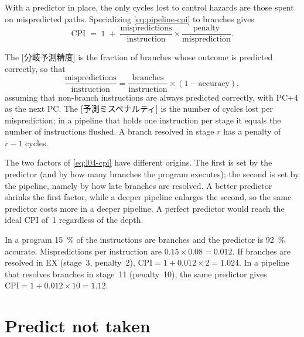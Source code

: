 \documentclass[../main.tex]{subfiles}
\begin{document}
With a predictor in place, the only cycles lost to control hazards are those
spent on mispredicted paths.
Specializing \cref{eq:pipeline-cpi} to branches gives
\begin{equation}
  \text{CPI} \;=\; 1 \;+\;
  \frac{\text{mispredictions}}{\text{instruction}} \times
  \frac{\text{penalty}}{\text{misprediction}} .
  \label{eq:l04-cpi}
\end{equation}

\begin{definition}
  The [分岐予測精度] is the fraction of
  branches whose outcome is predicted correctly, so that
  \begin{equation*}
    \frac{\text{mispredictions}}{\text{instruction}} =
    \frac{\text{branches}}{\text{instruction}} \times
    (1 - \text{accuracy}) ,
  \end{equation*}
  assuming that non-branch instructions are always predicted correctly, with
  PC+4 as the next PC.  The [予測ミスペナルティ] is
  the number of cycles lost per misprediction; in a pipeline that holds one
  instruction per stage it equals the number of instructions flushed.  A
  branch resolved in stage $r$ has a penalty of $r-1$ cycles.
\end{definition}

The two factors of \cref{eq:l04-cpi} have different origins.  The first is
set by the predictor (and by how many branches the program executes); the
second is set by the pipeline, namely by how late branches are resolved.  A
better predictor shrinks the first factor, while a deeper pipeline enlarges
the second, so the same predictor costs more in a deeper pipeline.  A perfect
predictor would reach the ideal CPI of~1 regardless of the depth.

\begin{example}
  \label{ex:l04-cpi}
  In a program \SI{15}{\percent} of the instructions are branches and the
  predictor is \SI{92}{\percent} accurate.  Mispredictions per instruction
  are $0.15 \times 0.08 = 0.012$.  If branches are resolved in EX (stage~3,
  penalty~2), $\text{CPI} = 1 + 0.012 \times 2 = 1.024$.  In a pipeline that
  resolves branches in stage~11 (penalty~10), the same predictor gives
  $\text{CPI} = 1 + 0.012 \times 10 = 1.12$.
\end{example}

\section{Predict not taken}
\label{sec:l04-not-taken}
\end{document}
